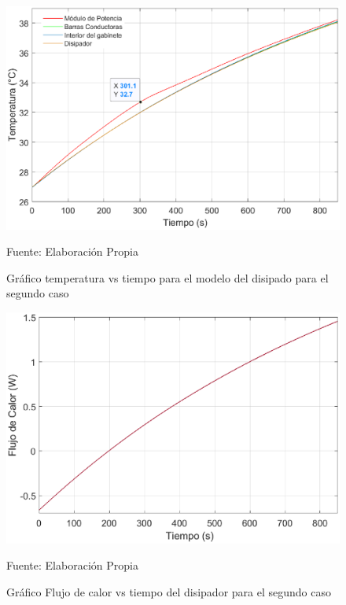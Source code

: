 \begin{figure}[H]
\centering
\includegraphics[scale=0.68]{Figuras/disipador_T_2.eps}
\caption{Gráfico temperatura vs tiempo para el modelo del disipado para el segundo caso}
Fuente: Elaboración Propia
\label{disipador T2}
\end{figure}

\begin{figure}[H]
\centering
\includegraphics[scale=0.69]{Figuras/disipador_Q_2.eps}
\caption{Gráfico Flujo de calor vs tiempo del disipador para el segundo caso}
Fuente: Elaboración Propia
\label{disipador Q2}
\end{figure}

